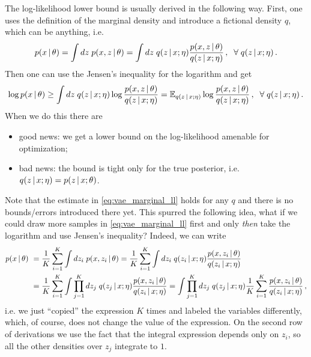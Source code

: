 The log-likelihood lower bound is usually derived in the following way.
First, one uses the definition of the marginal density and introduce a fictional density $q$, which can be anything, i.e.
\begin{align}
    p(x\,|\, \theta) = \int dz\; p(x, z\,|\, \theta) = \int dz\; q(z\,|\, x;\eta)\frac{p(x,z\,|\,\theta)}{q(z\,|\, x;\eta)}\,,\;\; \forall\; q(z\,|\, x;\eta)\,.
    \label{eq:vae_marginal_ll}
\end{align}
Then one can use the Jensen's inequality for the logarithm and get
\begin{align}
    \log p(x\,|\, \theta) \geq \int dz\; q(z\,|\, x;\eta)\log \frac{p(x,z\,|\, \theta)}{q(z\,|\, x;\eta)} = \mathbb{E}_{q(z\,|\, x;\eta)}\log \frac{p(x,z\,|\, \theta)}{q(z\,|\, x;\eta)}\,,\;\; \forall\; q(z\,|\, x;\eta)\,.
\end{align}
When we do this there are 
\begin{itemize}[label={}]
    \item \yes good news: we get a lower bound on the log-likelihood amenable for optimization;
    \item \no bad news: the bound is tight only for the true posterior, i.e. $q(z\,|\, x;\eta) = p(z\,|\, x;\theta)$.
\end{itemize}
Note that the estimate in \cref{eq:vae_marginal_ll} holds for any $q$ and there is no bounds/errors introduced there yet. 
This spurred the following idea, what if we could draw more samples in \cref{eq:vae_marginal_ll} first and only \textit{then} take the logarithm and use Jensen's inequality?
Indeed, we can write
\begin{align}
    p(x\,|\, \theta) ~&= \frac{1}{K}\sum_{i=1}^K\int dz_i\; p(x, z_i\,|\, \theta) = \frac{1}{K}\sum_{i=1}^K\int dz_i\; q(z_i\,|\, x;\eta)\frac{p(x,z_i\,|\,\theta)}{q(z_i\,|\, x;\eta)}\\
    ~&=\frac{1}{K}\sum_{i=1}^K\int \prod_{j=1}^K dz_j\; q(z_j\,|\, x;\eta)\frac{p(x,z_i\,|\,\theta)}{q(z_i\,|\, x;\eta)}=\int \prod_{j=1}^K dz_j\; q(z_j\,|\, x;\eta)\frac{1}{K}\sum_{i=1}^K\frac{p(x,z_i\,|\,\theta)}{q(z_i\,|\, x;\eta)}\,,
    \label{eq:iwae_marginal_ll}
\end{align}
i.e. we just ``copied'' the expression $K$ times and labeled the variables differently, which, of course, does not change the value of the expression. On the second row of derivations we use the fact that the integral expression depends only on $z_i$, so all the other densities over $z_j$ integrate to $1$. 
